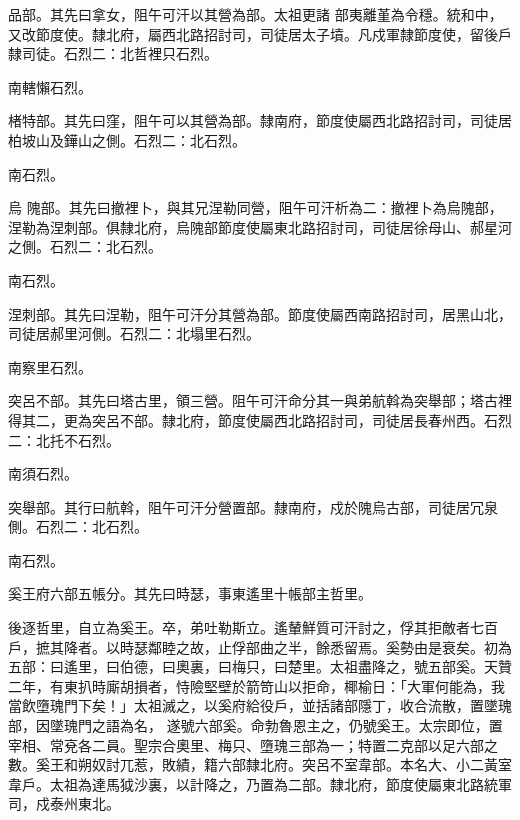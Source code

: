 \begin{pinyinscope}
 品部。其先曰拿女，阻午可汗以其營為部。太祖更諸
 部夷離堇為令穩。統和中，又改節度使。隸北府，屬西北路招討司，司徒居太子墳。凡戍軍隸節度使，留後戶隸司徒。石烈二：北哲裡只石烈。



 南轄懶石烈。



 楮特部。其先曰窪，阻午可以其營為部。隸南府，節度使屬西北路招討司，司徒居柏坡山及鏵山之側。石烈二：北石烈。



 南石烈。



 烏
 隗部。其先曰撤裡卜，與其兄涅勒同營，阻午可汗析為二：撤裡卜為烏隗部，涅勒為涅刺部。俱隸北府，烏隗部節度使屬東北路招討司，司徒居徐母山、郝星河之側。石烈二：北石烈。



 南石烈。



 涅刺部。其先曰涅勒，阻午可汗分其營為部。節度使屬西南路招討司，居黑山北，司徒居郝里河側。石烈二：北塌里石烈。



 南察里石烈。



 突呂不部。其先曰塔古里，領三營。阻午可汗命分其一與弟航斡為突舉部；塔古裡得其二，更為突呂不部。隸北府，節度使屬西北路招討司，司徒居長春州西。石烈二：北托不石烈。



 南須石烈。



 突舉部。其行曰航斡，阻午可汗分營置部。隸南府，戍於隗烏古部，司徒居冗泉側。石烈二：北石烈。



 南石烈。



 奚王府六部五帳分。其先曰時瑟，事東遙里十帳部主哲里。



 後逐哲里，自立為奚王。卒，弟吐勒斯立。遙輦鮮質可汗討之，俘其拒敵者七百戶，摭其降者。以時瑟鄰睦之故，止俘部曲之半，餘悉留焉。奚勢由是衰矣。初為五部：曰遙里，曰伯德，曰奧裏，曰梅只，曰楚里。太祖盡降之，號五部奚。天贊二年，有東扒時廝胡損者，恃險堅壁於箭笴山以拒命，椰榆日：「大軍何能為，我當飲墮瑰門下矣！」太祖滅之，以奚府給役戶，並括諸部隱丁，收合流散，置墜瑰部，因墜瑰門之語為名，
 遂號六部奚。命勃魯恩主之，仍號奚王。太宗即位，置宰相、常兗各二員。聖宗合奧里、梅只、墮瑰三部為一；特置二克部以足六部之數。奚王和朔奴討兀惹，敗績，籍六部隸北府。突呂不室韋部。本名大、小二黃室韋戶。太祖為達馬狘沙裏，以計降之，乃置為二部。隸北府，節度使屬東北路統軍司，戍泰州東北。




\end{pinyinscope}
